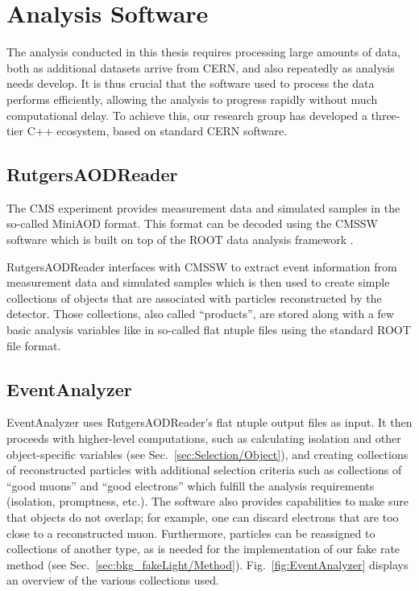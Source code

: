 \chapter{Analysis Software}
\label{app:Software}

The analysis conducted in this thesis requires processing large amounts of data, both as additional datasets arrive from CERN, and also repeatedly as analysis needs develop. It is thus crucial that the software used to process the data performs efficiently, allowing the analysis to progress rapidly without much computational delay. To achieve this, our research group has developed a three-tier C++ ecosystem, based on standard CERN software. 

\section{RutgersAODReader}
The CMS experiment provides measurement data and simulated samples in the so-called MiniAOD format. This format can be decoded using the CMSSW software \cite{CMSSW} which is built on top of the ROOT data analysis framework \cite{Brun:1997pa}.

RutgersAODReader interfaces with CMSSW to extract event information from measurement data and simulated samples which is then used to create simple collections of objects that are associated with particles reconstructed by the detector. Those collections, also called ``products'', are stored along with a few basic analysis variables like \MET in so-called flat ntuple files using the standard ROOT file format.

\section{EventAnalyzer}
\label{app:Software/EventAnalyzer}
EventAnalyzer uses RutgersAODReader's flat ntuple output files as input. It then proceeds with higher-level computations, such as calculating isolation and other object-specific variables (see Sec.~\ref{sec:Selection/Object}), and creating collections of reconstructed particles with additional selection criteria such as collections of ``good muons'' and ``good electrons'' which fulfill the analysis requirements (isolation, promptness, etc.). The software also provides capabilities to make sure that objects do not overlap; for example, one can discard electrons that are too close to a reconstructed muon. Furthermore, particles can be reassigned to collections of another type, as is needed for the implementation of our fake rate method (see Sec.~\ref{sec:bkg_fakeLight/Method}). Fig.~\ref{fig:EventAnalyzer} displays an overview of the various collections used.

